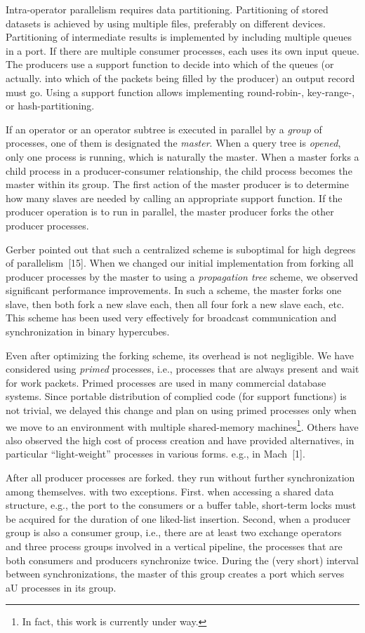 \documentclass[a4paper,12pt,notitlepage,twoside,openright]{article}
\begin{document}
Intra-operator parallelism requires data partitioning.
Partitioning of stored datasets is achieved by using multiple
files, preferably on different devices. Partitioning of intermediate
results is implemented by including multiple queues
in a port. If there are multiple consumer processes, each
uses its own input queue. The producers use a support
function to decide into which of the queues (or actually.
into which of the packets being filled by the producer) an
output record must go. Using a support function allows
implementing round-robin-, key-range-, or hash-partitioning.

If an operator or an operator subtree is executed in
parallel by a \emph{group} of processes, one of them is designated
the \emph{master}. When a query tree is \emph{opened}, only one process
is running, which is naturally the master. When a master
forks a child process in a producer-consumer relationship,
the child process becomes the master within its group. The
first action of the master producer is to determine how
many slaves are needed by calling an appropriate support
function. If the producer operation is to run in parallel, the
master producer forks the other producer processes.

Gerber pointed out that such a centralized scheme is
suboptimal for high degrees of parallelism~{[15]}. When we
changed our initial implementation from forking all producer
processes by the master to using a \emph{propagation tree} scheme,
we observed significant performance improvements. In such
a scheme, the master forks one slave, then both fork a new
slave each, then all four fork a new slave each, etc. This
scheme has been used very effectively for broadcast communication
and synchronization in binary hypercubes.

Even after optimizing the forking scheme, its overhead
is not negligible. We have considered using \emph{primed}
processes, i.e., processes that are always present and wait
for work packets. Primed processes are used in many commercial
database systems. Since portable distribution of
complied code (for support functions) is not trivial, we
delayed this change and plan on using primed processes
only when we move to an environment with multiple
shared-memory machines\footnote{%
In fact, this work is currently under way.
}. Others have also observed the
high cost of process creation and have provided alternatives,
in particular ``light-weight'' processes in various forms. e.g.,
in Mach~{[1]}.

After all producer processes are forked. they run
without further synchronization among themselves. with two
exceptions. First. when accessing a shared data structure,
e.g., the port to the consumers or a buffer table, short-term
locks must be acquired for the duration of one liked-list
insertion. Second, when a producer group is also a consumer
group, i.e., there are at least two exchange operators
and three process groups involved in a vertical pipeline, the
processes that are both consumers and producers synchronize
twice. During the (very short) interval between synchronizations,
the master of this group creates a port which serves
aU processes in its group.
\end{document}
